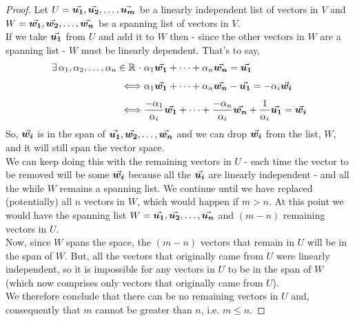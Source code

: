 \documentclass[MathsNotesBase.tex]{subfiles}
\begin{document}
	\bigskip
	\begin{proof}
	Let $U = \vec{\bm{u_1}}, \vec{\bm{u_2}}, \dots, \vec{\bm{u_m}}$ be a linearly independent list of vectors in $V$ and $W = \vec{\bm{w_1}}, \vec{\bm{w_2}}, \dots, \vec{\bm{w_n}}$ be a spanning list of vectors in $V$.\\
	If we take $\vec{\bm{u_1}}$ from $U$ and add it to $W$ then - since the other vectors in $W$ are a spanning list - $W$ must be linearly dependent. That's to say,
	\begin{align*}
	\exists\,\alpha_1,\alpha_2,\dots,\alpha_n \in \mathbb{R}^{} \;\cdot\; &\alpha_1\vec{\bm{w_1}} + \dots + \alpha_n\vec{\bm{w_n}} = \vec{\bm{u_1}} \\[4pt]
	\iff &\alpha_1\vec{\bm{w_1}} + \dots + \alpha_n\vec{\bm{w_n}} - \vec{\bm{u_1}} = -\alpha_i\vec{\bm{w_i}}\\[4pt]
	\iff &\frac{-\alpha_1}{\alpha_i}\vec{\bm{w_1}} + \dots + \frac{-\alpha_n}{\alpha_i}\vec{\bm{w_n}} + \frac{1}{\alpha_i}\vec{\bm{u_1}} = \vec{\bm{w_i}}
	\end{align*}
	So, $\vec{\bm{w_i}}$ is in the span of $\vec{\bm{u_1}}, \vec{\bm{w_2}}, \dots, \vec{\bm{w_n}}$ and we can drop $\vec{\bm{w_i}}$ from the list, $W$, and it will still span the vector space.\\
	We can keep doing this with the remaining vectors in $U$ - each time the vector to be removed will be some $\vec{\bm{w_i}}$ because all the $\vec{\bm{u_i}}$ are linearly independent - and all the while $W$ remains a spanning list. We continue until we have replaced (potentially) all $n$ vectors in $W$, which would happen if $m > n$. At this point we would have the spanning list $W = \vec{\bm{u_1}}, \vec{\bm{u_2}}, \dots, \vec{\bm{u_n}}$ and $(m - n)$ remaining vectors in $U$.\\
	Now, since $W$ spans the space, the $(m - n)$ vectors that remain in $U$ will be in the span of $W$. But, all the vectors that originally came from $U$ were linearly independent, so it is impossible for any vectors in $U$ to be in the span of $W$ (which now comprises only vectors that originally came from $U$).\\
	We therefore conclude that there can be no remaining vectors in $U$ and, consequently that $m$ cannot be greater than $n$, i.e. $m \leq n$.
	\end{proof}
\end{document}
